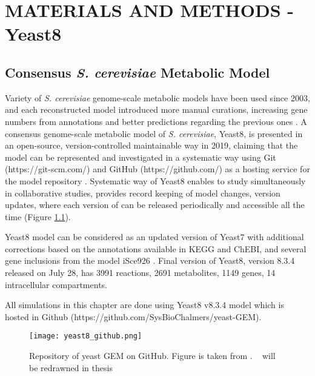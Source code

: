 \chapter{MATERIALS AND METHODS - Yeast8}

\section{Consensus \emph{S. cerevisiae} Metabolic Model}
Variety of \emph{S. cerevisiae} genome-scale metabolic models have been used since 2003, and each reconstructed model introduced more manual curations, increasing gene numbers from annotations and better predictions regarding the previous ones \cite{lopes2017genome}. A consensus genome-scale metabolic model of \emph{S. cerevisiae}, Yeast8, is presented in an open-source, version-controlled maintainable way in 2019, claiming that the model can be represented and investigated in a systematic way using Git (https://git-scm.com/) and GitHub (https://github.com/) as a hosting service for the model repository \cite{lu2019consensus}. Systematic way of Yeast8 enables to study simultaneously in collaborative studies, provides record keeping of model changes, version updates, where each version of can be released periodically and accessible all the time (Figure \ref{fig:yeast8_github}).

Yeast8 model can be considered as an updated version of Yeast7 \cite{aung2013revising} with additional corrections based on the annotations available in KEGG and ChEBI, and several gene inclusions from the model iSce926 \cite{chowdhury2015using}. Final version of Yeast8, version 8.3.4 released on July 28, has 3991 reactions, 2691 metabolites, 1149 genes, 14 intracellular compartments.

All simulations in this chapter are done using Yeast8 v8.3.4 model which is hosted in Github (https://github.com/SysBioChalmers/yeast-GEM).

\begin{figure}[H]
\begin{center}
\texttt{[image: yeast8\_github.png]}
\end{center}
\caption[Repository of yeast GEM on GitHub]{Repository of yeast GEM on GitHub. Figure is taken from \cite{lu2019consensus}. ~ will be redrawned in thesis}
\label{fig:yeast8_github}
\end{figure}

